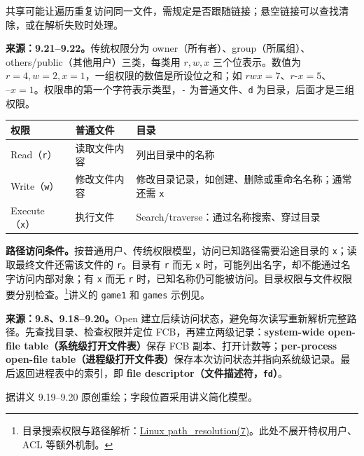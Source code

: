 共享可能让遍历重复访问同一文件，需规定是否跟随链接；悬空链接可以查找清除，或在解析失败时处理。


\textbf{来源：9.21--9.22。}传统权限分为 owner（所有者）、group（所属组）、others/public（其他用户）三类，每类用 $r,w,x$ 三个位表示。数值为 $r=4,w=2,x=1$，一组权限的数值是所设位之和；如 $rwx=7$、$r\texttt{-}x=5$、$\texttt{--}x=1$。权限串的第一个字符表示类型，\texttt{-} 为普通文件、\texttt{d} 为目录，后面才是三组权限。

\begin{center}
\begin{tabularx}{\textwidth}{@{}l>{\raggedright\arraybackslash}X>{\raggedright\arraybackslash}X@{}}
\toprule
权限 & 普通文件 & 目录 \\
\midrule
Read（\texttt{r}） & 读取文件内容 & 列出目录中的名称 \\
Write（\texttt{w}） & 修改文件内容 & 修改目录记录，如创建、删除或重命名名称；通常还需 \texttt{x} \\
Execute（\texttt{x}） & 执行文件 & Search/traverse：通过名称搜索、穿过目录 \\
\bottomrule
\end{tabularx}
\end{center}

\textbf{路径访问条件。}按普通用户、传统权限模型，访问已知路径需要沿途目录的 \texttt{x}；读取最终文件还需该文件的 \texttt{r}。目录有 \texttt{r} 而无 \texttt{x} 时，可能列出名字，却不能通过名字访问内部对象；有 \texttt{x} 而无 \texttt{r} 时，已知名称仍可能被访问。目录权限与文件权限要分别检查。\footnote{目录搜索权限与路径解析：\href{https://man7.org/linux/man-pages/man7/path_resolution.7.html}{Linux path\_resolution(7)}。此处不展开特权用户、ACL 等额外机制。}讲义的 \texttt{game1} 和 \texttt{games} 示例见。


\textbf{来源：9.8、9.18--9.20。}Open 建立后续访问状态，避免每次读写重新解析完整路径。先查找目录、检查权限并定位 FCB，再建立两级记录：\textbf{system-wide open-file table（系统级打开文件表）}保存 FCB 副本、打开计数等；\textbf{per-process open-file table（进程级打开文件表）}保存本次访问状态并指向系统级记录。最后返回进程表中的索引，即 \textbf{file descriptor（文件描述符，\texttt{fd}）}。

\begin{center}


{\small 据讲义 9.19--9.20 原创重绘；字段位置采用讲义简化模型。}
\end{center}

